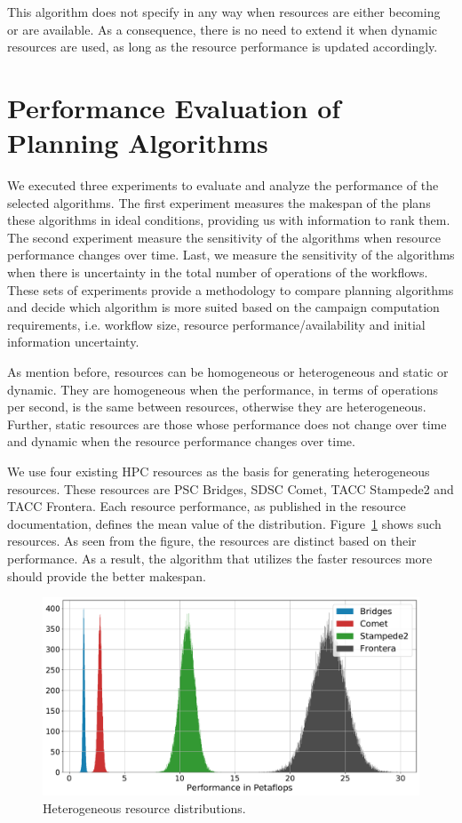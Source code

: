 This algorithm does not specify in any way when resources are either becoming or are available.
As a consequence, there is no need to extend it when dynamic resources are used, as long as the resource performance is updated accordingly.

\section{Performance Evaluation of Planning Algorithms}
\label{sec:algo_perf_comp}

We executed three experiments to evaluate and analyze the performance of the selected algorithms.
The first experiment measures the makespan of the plans these algorithms in ideal conditions, providing us with information to rank them.
The second experiment measure the sensitivity of the algorithms when resource performance changes over time.
Last, we measure the sensitivity of the algorithms when there is uncertainty in the total number of operations of the workflows.
These sets of experiments provide a methodology to compare planning algorithms and decide which algorithm is more suited based on the campaign computation requirements, i.e. workflow size, resource performance/availability and initial information uncertainty.

As mention before, resources can be homogeneous or heterogeneous and static or dynamic.
They are homogeneous when the performance, in terms of operations per second, is the same between resources, otherwise they are heterogeneous.
Further, static resources are those whose performance does not change over time and dynamic when the resource performance changes over time.

We use four existing HPC resources as the basis for generating heterogeneous resources.
These resources are PSC Bridges, SDSC Comet, TACC Stampede2 and TACC Frontera.
Each resource performance, as published in the resource documentation, defines the mean value of the distribution.
Figure~\ref{fig:heter_res} shows such resources.
As seen from the figure, the resources are distinct  based on their performance.
As a result, the algorithm that utilizes the faster resources more should provide the better makespan.

\begin{figure}[ht!]
    \centering
    \includegraphics[width=.95\textwidth]{figures/campaign/hetero_res.pdf}
    \caption{Heterogeneous resource distributions.}
    \label{fig:heter_res}
\end{figure}


